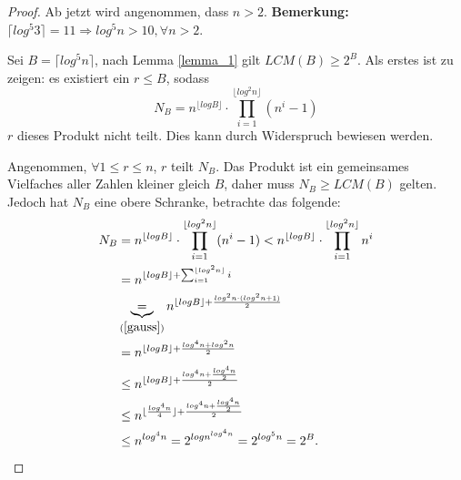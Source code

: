 \documentclass[12pt,oneside]{article}
\theoremstyle{remark}
\theoremstyle{definition}
\begin{document}
\begin{flushleft}
\begin{proof}
Ab jetzt wird angenommen, dass $n > 2$.\newline\newline
\textbf{Bemerkung: } $\lceil log^5 3 \rceil = 11 \Rightarrow log^5 n > 10, \forall n > 2$.

Sei $B = \lceil log^5 n \rceil$, nach Lemma \ref{lemma_1} gilt $LCM(B) \geq 2^B$. Als erstes ist zu zeigen: es existiert ein $r \leq B$, sodass
\begin{equation}\label{prod_cor}
     N_{B} = n^{\lfloor log B \rfloor } \cdot \prod_{i = 1}^{\lfloor log^2 n \rfloor} (n^i - 1)
\end{equation}
$r$ dieses Produkt nicht teilt. Dies kann durch Widerspruch bewiesen werden.

Angenommen, $\forall 1 \leq r \leq n$, $r$ teilt $N_{B}$. Das Produkt ist ein gemeinsames Vielfaches aller Zahlen kleiner gleich $B$, daher muss $N_{B} \geq LCM(B)$ gelten. Jedoch hat $N_{B}$ eine obere Schranke, betrachte das folgende:
\begin{equation}\label{long_p}
    \begin{split}
        \begin{aligned}
            N_{B} &= n^{\lfloor log B \rfloor } \cdot \prod_{i = 1}^{\lfloor log^2 n \rfloor} (n^i - 1)
                < n^{\lfloor log B \rfloor } \cdot \prod_{i = 1}^{\lfloor log^2 n \rfloor} n^i \\
                &= n^{\lfloor log B \rfloor + \sum_{i = 1}^{\lfloor log^2 n \rfloor } i}\\ 
                &\underbrace{=}_{(\ref{gauss})} n^{\lfloor log B \rfloor + \frac{log^2 n \cdot (log^2 n + 1)}{2}}  \\
                &= n^{\lfloor log B \rfloor + \frac{log^4 n + log^2 n}{2}}\\
                & \leq n^{\lfloor log B \rfloor + \frac{log^4 n + \frac{log^4 n}{2}}{2}}\\
                & \leq n^{\lfloor \frac{log^4 n}{4} \rfloor + \frac{log^4 n + \frac{log^4 n}{2}}{2}}\\
                & \leq n^{log^4 n} = 2^{log n^{log^4 n}} = 2^{log^5 n} = 2^{B}.
        \end{aligned}
    \end{split}
\end{equation}

\end{proof}
\end{flushleft}
\end{document}
